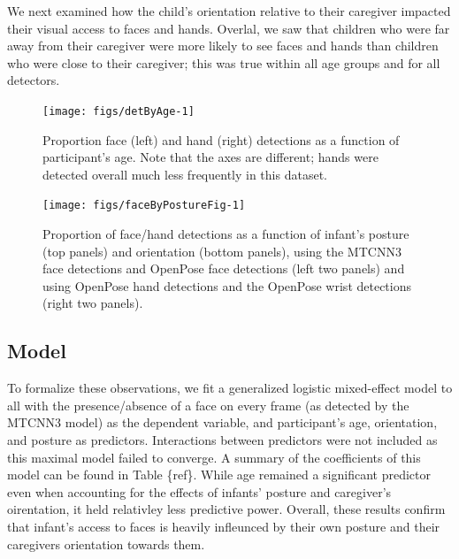 \documentclass[10pt, letterpaper]{article}
\newenvironment{CodeChunk}{}{}
\begin{document}
We next examined how the child's orientation relative to their caregiver
impacted their visual access to faces and hands. Overlal, we saw that
children who were far away from their caregiver were more likely to see
faces and hands than children who were close to their caregiver; this
was true within all age groups and for all detectors.

\begin{CodeChunk}
\begin{figure}[h]

{\centering \texttt{[image: figs/detByAge-1]} 

}

\caption[Proportion face (left) and hand (right) detections as a function of participant's age]{Proportion face (left) and hand (right) detections as a function of participant's age. Note that the axes are different; hands were detected overall much less frequently in this dataset.}\label{fig:detByAge}
\end{figure}
\end{CodeChunk}

\begin{CodeChunk}
\begin{figure}[h]

{\centering \texttt{[image: figs/faceByPostureFig-1]} 

}

\caption[Proportion of face/hand detections as a function of infant's posture (top panels) and orientation (bottom panels), using the MTCNN3 face detections and OpenPose face detections (left two panels) and using OpenPose hand detections and the OpenPose wrist detections (right two panels)]{Proportion of face/hand detections as a function of infant's posture (top panels) and orientation (bottom panels), using the MTCNN3 face detections and OpenPose face detections (left two panels) and using OpenPose hand detections and the OpenPose wrist detections (right two panels).}\label{fig:faceByPostureFig}
\end{figure}
\end{CodeChunk}

\subsection{Model}\label{model}

To formalize these observations, we fit a generalized logistic
mixed-effect model to all with the presence/absence of a face on every
frame (as detected by the MTCNN3 model) as the dependent variable, and
participant's age, orientation, and posture as predictors. Interactions
between predictors were not included as this maximal model failed to
converge. A summary of the coefficients of this model can be found in
Table \{ref\}. While age remained a significant predictor even when
accounting for the effects of infants' posture and caregiver's
oirentation, it held relativley less predictive power. Overall, these
results confirm that infant's access to faces is heavily infleunced by
their own posture and their caregivers orientation towards them.
\end{document}
